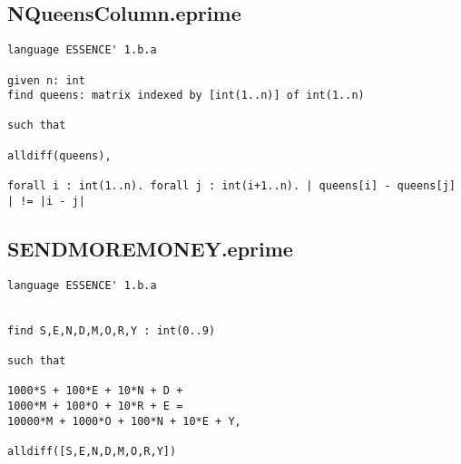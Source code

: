 \documentclass{article}
\begin{document}
\subsection{NQueensColumn.eprime}
\begin{verbatim}
language ESSENCE' 1.b.a

given n: int
find queens: matrix indexed by [int(1..n)] of int(1..n)

such that

alldiff(queens),

forall i : int(1..n). forall j : int(i+1..n). | queens[i] - queens[j] | != |i - j|
\end{verbatim}
\subsection{SENDMOREMONEY.eprime}
\begin{verbatim}
language ESSENCE' 1.b.a


find S,E,N,D,M,O,R,Y : int(0..9)

such that

1000*S + 100*E + 10*N + D + 
1000*M + 100*O + 10*R + E =
10000*M + 1000*O + 100*N + 10*E + Y,

alldiff([S,E,N,D,M,O,R,Y])
\end{verbatim}
\end{document}
